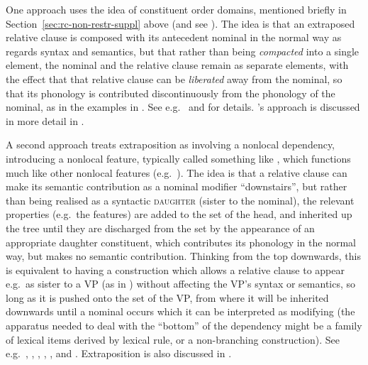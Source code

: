 \documentclass[output=paper,biblatex,babelshorthands,newtxmath,draftmode,colorlinks,citecolor=brown]{langscibook}
\begin{document}
\largerpage
One approach uses the idea of constituent order domains, mentioned briefly in
Section~\ref{sec:rc-non-restr-suppl} above (and see ). The idea is
that an extraposed relative clause is composed with its antecedent nominal in the normal way as regards syntax and semantics, but that rather
than being \emph{compacted} into a single  element, the nominal and the
relative clause remain as separate  elements, with the effect that that
relative clause can be \emph{liberated} away from the nominal, so that its phonology is
contributed discontinuously from the phonology of the nominal, as in the examples in
.  See e.g.\  and 
for details. \citeauthor{Kathol:Pollard:95}'s approach is discussed in more detail in .

A second approach treats extraposition as involving a nonlocal dependency, introducing a
nonlocal feature, typically called something like , which functions much
like other nonlocal features (e.g.\ ).  The idea is that a relative
clause can make its semantic contribution as a nominal modifier ``downstairs'', but rather
than being realised as a syntactic \textsc{daughter} (sister to the nominal), the relevant
properties (e.g.\ the  features) are added to the  set of the
head, and inherited up the tree until they are discharged from the  set by
the appearance of an appropriate daughter constituent, which contributes its
phonology in the normal way, but makes no semantic contribution. Thinking from the top
downwards, this is equivalent to having a construction which allows a relative clause to
appear e.g.\ as sister to a VP (as in ) without affecting the VP's syntax or
semantics, so long as it is pushed onto the  set of the VP, from where it
will be inherited downwards until a nominal occurs which it can be interpreted as modifying (the
apparatus needed to deal with the ``bottom'' of the dependency might be a family of lexical
items derived by lexical rule, or a non-branching construction). See e.g.\
, ,  , , ,
and \citew{Crysmann2013a}. Extraposition is also discussed in .
\end{document}

